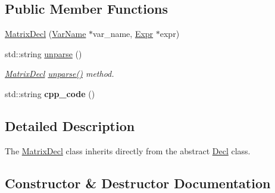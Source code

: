 \subsection*{Public Member Functions}
\begin{DoxyCompactItemize}
\item 
\hyperlink{classfcal_1_1ast_1_1MatrixDecl_ac46452a489e1f9d3c55082468b605810}{Matrix\+Decl} (\hyperlink{classfcal_1_1ast_1_1VarName}{Var\+Name} $\ast$var\+\_\+name, \hyperlink{classfcal_1_1ast_1_1Expr}{Expr} $\ast$expr)
\item 
std\+::string \hyperlink{classfcal_1_1ast_1_1MatrixDecl_adae5ce31554a86fb0273d3d7d9258418}{unparse} ()
\begin{DoxyCompactList}\small\item\em \hyperlink{classfcal_1_1ast_1_1MatrixDecl}{Matrix\+Decl} \hyperlink{classfcal_1_1ast_1_1MatrixDecl_adae5ce31554a86fb0273d3d7d9258418}{unparse()} method. \end{DoxyCompactList}\item 
std\+::string {\bfseries cpp\+\_\+code} ()\hypertarget{classfcal_1_1ast_1_1MatrixDecl_af81d9bd3c45804445636cca2f6268811}{}\label{classfcal_1_1ast_1_1MatrixDecl_af81d9bd3c45804445636cca2f6268811}

\end{DoxyCompactItemize}


\subsection{Detailed Description}
The \hyperlink{classfcal_1_1ast_1_1MatrixDecl}{Matrix\+Decl} class inherits directly from the abstract \hyperlink{classfcal_1_1ast_1_1Decl}{Decl} class. 

\subsection{Constructor \& Destructor Documentation}

